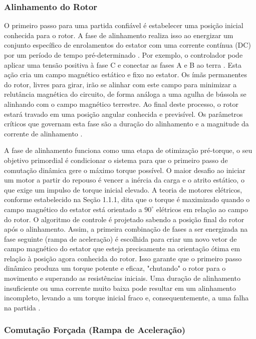 \documentclass[12pt, a4paper, openright, oneside, brazilian]{abntex2}
\begin{document}
\subsubsection{Alinhamento do Rotor}

O primeiro passo para uma partida confiável é estabelecer uma posição inicial conhecida para o rotor. A fase de alinhamento realiza isso ao energizar um conjunto específico de enrolamentos do estator com uma corrente contínua (DC) por um período de tempo pré-determinado \cite{ti2022minimizing, nxp2023sensorless}. Por exemplo, o controlador pode aplicar uma tensão positiva à fase C e conectar as fases A e B ao terra \cite{ti2022minimizing}. Esta ação cria um campo magnético estático e fixo no estator. Os ímãs permanentes do rotor, livres para girar, irão se alinhar com este campo para minimizar a relutância magnética do circuito, de forma análoga a uma agulha de bússola se alinhando com o campo magnético terrestre. Ao final deste processo, o rotor estará travado em uma posição angular conhecida e previsível. Os parâmetros críticos que governam esta fase são a duração do alinhamento e a magnitude da corrente de alinhamento \cite{ti2022minimizing}.

 A fase de alinhamento funciona como uma etapa de otimização pré-torque, o seu objetivo primordial é condicionar o sistema para que o primeiro passo de comutação dinâmica gere o máximo torque possível. O maior desafio ao iniciar um motor a partir do repouso é vencer a inércia da carga e o atrito estático, o que exige um impulso de torque inicial elevado. A teoria de motores elétricos, conforme estabelecido na Seção 1.1.1, dita que o torque é maximizado quando o campo magnético do estator está orientado a $90^{\circ}$ elétricos em relação ao campo do rotor. O algoritmo de controle é projetado sabendo a posição final do rotor após o alinhamento. Assim, a primeira combinação de fases a ser energizada na fase seguinte (rampa de aceleração) é escolhida para criar um novo vetor de campo magnético do estator que esteja precisamente na orientação ótima em relação à posição agora conhecida do rotor. Isso garante que o primeiro passo dinâmico produza um torque potente e eficaz, "chutando" o rotor para o movimento e superando as resistências iniciais. Uma duração de alinhamento insuficiente ou uma corrente muito baixa pode resultar em um alinhamento incompleto, levando a um torque inicial fraco e, consequentemente, a uma falha na partida \cite{ti2022minimizing, jones2025failures}.

\subsubsection{Comutação Forçada (Rampa de Aceleração)}
\end{document}
